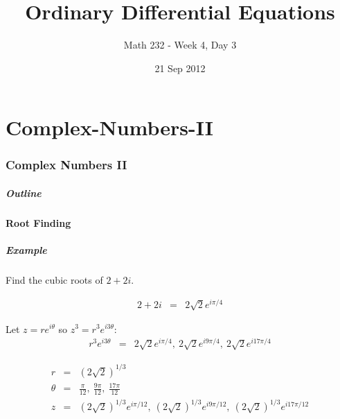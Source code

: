 \part{Complex-Numbers-II}
\section{Complex Numbers II}

\title{Ordinary Differential Equations}
\subtitle{Math 232 - Week 4, Day 3}
\date{21 Sep 2012}

\begin{frame}
  \titlepage
\end{frame}

\begin{frame}
  \frametitle{Outline}
\end{frame}


\subsection{Root Finding}


\begin{frame}
  \frametitle{Example}

  Find the cubic roots of $2+2i$.

  \begin{eqnarray*}
    2 + 2i & = & 2\sqrt{2} e^{i\pi/4}
  \end{eqnarray*}

  Let $z=re^{i\theta}$ so $z^3=r^3e^{i3\theta}$:
  \begin{eqnarray*}
    r^3e^{i3\theta} & = & 2\sqrt{2} e^{i\pi/4}, ~ 2\sqrt{2} e^{i9\pi/4}, ~ 2\sqrt{2} e^{i17\pi/4}
  \end{eqnarray*}

  \begin{eqnarray*}
    r &  = & (2\sqrt{2})^{1/3} \\
    \theta & = & \frac{\pi}{12}, ~ \frac{9\pi}{12}, ~ \frac{17\pi}{12} \\
    z & = &  (2\sqrt{2})^{1/3} e^{i\pi/12}, ~ (2\sqrt{2})^{1/3} e^{i9\pi/12}, ~ (2\sqrt{2})^{1/3} e^{i17\pi/12}
  \end{eqnarray*}

\end{frame}



